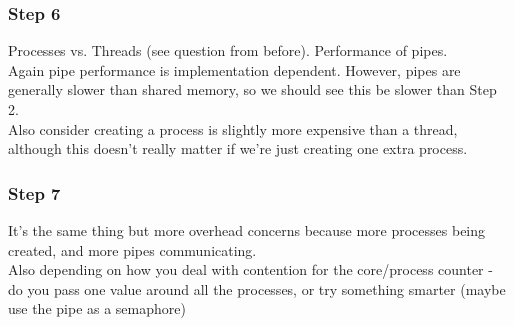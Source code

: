 \documentclass{beamer}
\begin{document}
\begin{frame}
  \frametitle{Step 6}
  Processes vs. Threads (see question from before). Performance of pipes.\\
  \pause
  Again pipe performance is implementation dependent. However, pipes are generally slower than shared memory, so we should see this be slower than Step 2.\\
  Also consider creating a process is slightly more expensive than a thread, although this doesn't really matter if we're just creating one extra process.
\end{frame}
\begin{frame}
  \frametitle{Step 7}
  It's the same thing but more overhead concerns because more processes being created, and more pipes communicating.\\
  Also depending on how you deal with contention for the core/process counter - do you pass one value around all the processes, or try something smarter (maybe use the pipe as a semaphore)
\end{frame}
\end{document}
